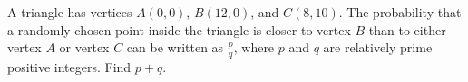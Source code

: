 A triangle has vertices $A(0,0)$, $B(12,0)$, and $C(8,10)$. The probability that a randomly chosen point inside the triangle is closer to vertex $B$ than to either vertex $A$ or vertex $C$ can be written as $\frac{p}{q}$, where $p$ and $q$ are relatively prime positive integers. Find $p+q$.